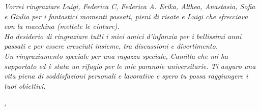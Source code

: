 \noindent \textit{Vorrei ringraziare Luigi, Federica C, Federica A. Erika, Althea, Anastasia, Sofia e Giulia per i fantastici momenti passati, pieni di risate e Luigi che sfrecciava con la macchina (mettete le cinture). }\\

\noindent \textit{Ho desiderio di ringraziare tutti i miei amici d'infanzia per i bellissimi anni passati e per essere cresciuti insieme, tra discussioni e divertimento.}\\

\noindent \textit{Un ringraziamento speciale per una ragazza speciale, Camilla che mi ha supportato ed è stata un rifugio per le mie paranoie universitarie. Ti auguro una vita piena di soddisfazioni personali e lavorative e spero tu possa raggiungere i tuoi obiettivi.}\\
\bigskip

\noindent\textit{\myLocation, \myTime}
\hfill \myName

\endgroup
